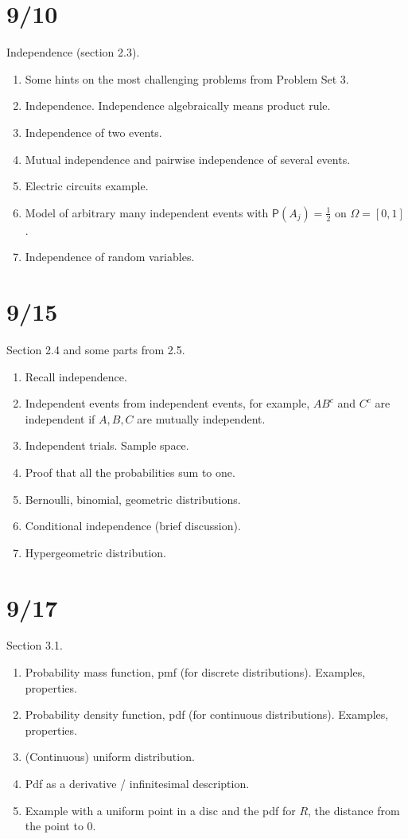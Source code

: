 \documentclass[letterpaper,11pt,oneside,reqno]{amsart}
\numberwithin{equation}{section}
\theoremstyle{definition}
\begin{document}
\section{9/10}

Independence (section 2.3).

\begin{enumerate}
	\item Some hints on the most challenging problems from Problem Set 3.
	\item Independence. Independence algebraically means product rule.
	\item Independence of two events.
	\item Mutual independence and pairwise independence of several events.
	\item Electric circuits example.
	\item Model of 
		arbitrary many
		independent events with $\mathsf{P}(A_j)=\frac{1}{2}$ on $\Omega=[0,1]$.
	\item Independence of random variables.

\end{enumerate}

\section{9/15}

Section 2.4 and some parts from 2.5.

\begin{enumerate}
	\item Recall independence.
	\item Independent events from independent events, for example, 
		$AB^c$ and $C^c$ are independent if $A,B,C$ are mutually independent.
	\item Independent trials. Sample space.
	\item Proof that all the probabilities sum to one.
	\item Bernoulli, binomial, geometric distributions.
	\item Conditional independence (brief discussion).
	\item Hypergeometric distribution.
\end{enumerate}

\section{9/17}

Section 3.1.

\begin{enumerate}
	\item Probability mass function, pmf (for discrete distributions). Examples, properties.
	\item Probability density function, pdf (for continuous distributions).
		Examples, properties. 
	\item (Continuous) uniform distribution.
	\item Pdf as a derivative / infinitesimal description.
	\item Example with a uniform point in a disc and the pdf for $R$, the distance from the 
		point to $0$.
\end{enumerate}
\end{document}
